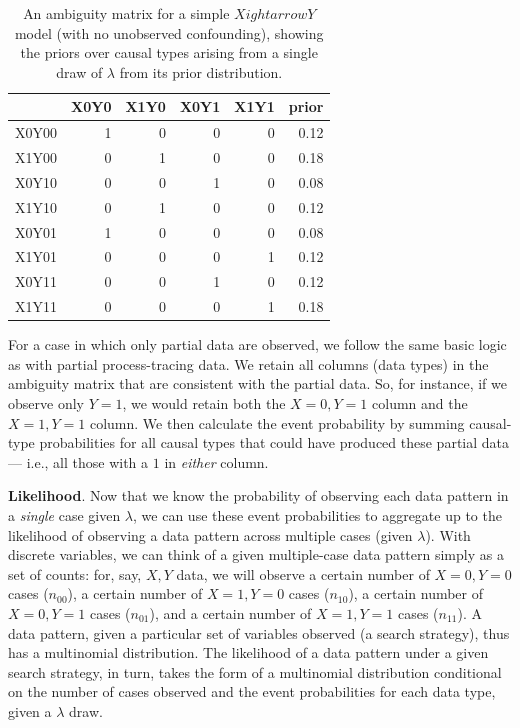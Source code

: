 \documentclass[
  12pt,
]{book}
\begin{document}
\begin{table}

\caption{\label{tab:ambigmatrixmix}An ambiguity matrix for a simple $X ightarrow Y$ model (with no unobserved confounding), showing the priors over causal types arising from a single draw of $\lambda$ from its prior distribution.}
\centering
\begin{tabular}[t]{l|r|r|r|r|r}
\hline
  & X0Y0 & X1Y0 & X0Y1 & X1Y1 & prior\\
\hline
X0Y00 & 1 & 0 & 0 & 0 & 0.12\\
\hline
X1Y00 & 0 & 1 & 0 & 0 & 0.18\\
\hline
X0Y10 & 0 & 0 & 1 & 0 & 0.08\\
\hline
X1Y10 & 0 & 1 & 0 & 0 & 0.12\\
\hline
X0Y01 & 1 & 0 & 0 & 0 & 0.08\\
\hline
X1Y01 & 0 & 0 & 0 & 1 & 0.12\\
\hline
X0Y11 & 0 & 0 & 1 & 0 & 0.12\\
\hline
X1Y11 & 0 & 0 & 0 & 1 & 0.18\\
\hline
\end{tabular}
\end{table}

For a case in which only partial data are observed, we follow the same basic logic as with partial process-tracing data. We retain all columns (data types) in the ambiguity matrix that are consistent with the partial data. So, for instance, if we observe only \(Y=1\), we would retain both the \(X=0, Y=1\) column and the \(X=1, Y=1\) column. We then calculate the event probability by summing causal-type probabilities for all causal types that could have produced these partial data --- i.e., all those with a \(1\) in \emph{either} column.

\textbf{Likelihood}. Now that we know the probability of observing each data pattern in a \emph{single} case given \(\lambda\), we can use these event probabilities to aggregate up to the likelihood of observing a data pattern across multiple cases (given \(\lambda\)). With discrete variables, we can think of a given multiple-case data pattern simply as a set of counts: for, say, \(X, Y\) data, we will observe a certain number of \(X=0, Y=0\) cases (\(n_{00}\)), a certain number of \(X=1, Y=0\) cases (\(n_{10}\)), a certain number of \(X=0, Y=1\) cases (\(n_{01}\)), and a certain number of \(X=1, Y=1\) cases (\(n_{11}\)). A data pattern, given a particular set of variables observed (a search strategy), thus has a multinomial distribution. The likelihood of a data pattern under a given search strategy, in turn, takes the form of a multinomial distribution conditional on the number of cases observed and the event probabilities for each data type, given a \(\lambda\) draw.
\end{document}
